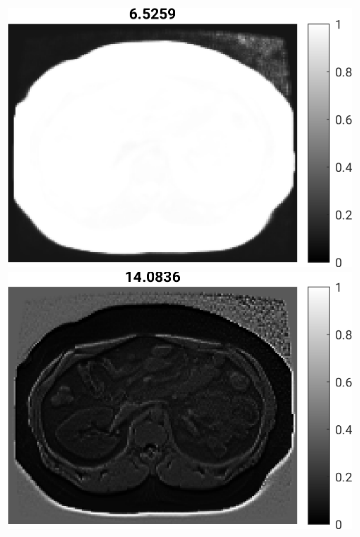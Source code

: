 \documentclass[10pt,twoside]{book}
\begin{document}
\begin{figure}
\begin{subfigure}{0.31\textwidth}
    \includegraphics[height=0.77\textwidth]{scenario4_learnedFeatureMaps_feature2}
    \includegraphics[height=0.77\textwidth]{scenario4_learnedFeatureMaps_feature3}
    \caption{}
    \label{fig:CNN_output_d}
  \end{subfigure}
  \hspace{10ex}
  \begin{subfigure}{0.31\textwidth}
    \centering

\end{subfigure}
\end{figure}
\end{document}
